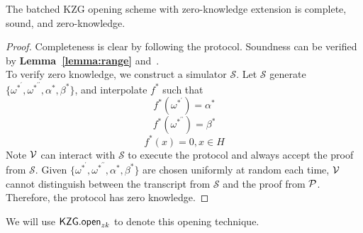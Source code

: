 \begin{theorem}
The batched KZG opening scheme with zero-knowledge extension is complete, sound, and zero-knowledge.
\end{theorem}
\begin{proof}
Completeness is clear by following the protocol. Soundness can be verified by \textbf{Lemma~\ref{lemma:range}} and~\cite{plonk}. \\
To verify zero knowledge, we construct a simulator $\mathcal{S}$. Let $\mathcal{S}$ generate $\{\omega^{*^\prime},\omega^{*^{\prime\prime}},\alpha^*,\beta^*\}$, and interpolate $f^*$ such that
\[ f^*(\omega^{*^\prime})=\alpha^* \]
\[ f^*(\omega^{*^{\prime\prime}})=\beta^* \]
\[ f^*(x)=0,x\in{H} \]
Note $\mathcal{V}$ can interact with $\mathcal{S}$ to execute the protocol and always accept the proof from $\mathcal{S}$. Given $\{\omega^{*^\prime},\omega^{*^{\prime\prime}},\alpha^*,\beta^*\}$ are chosen uniformly at random each time, $\mathcal{V}$ cannot distinguish between the transcript from $\mathcal{S}$ and the proof from $\mathcal{P}$. Therefore, the protocol has zero knowledge.
\end{proof}
We will use $\mathsf{KZG.open}_{zk}$ to denote this opening technique.

